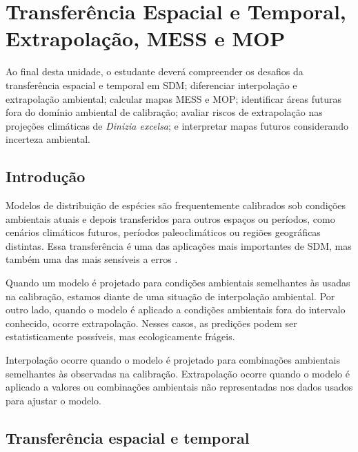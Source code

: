 \chapter[Transferência e extrapolação]{Transferência Espacial e Temporal, Extrapolação, MESS e MOP}

\begin{objetivos}
	Ao final desta unidade, o estudante deverá compreender os desafios da transferência espacial e temporal em SDM; diferenciar interpolação e extrapolação ambiental; calcular mapas MESS e MOP; identificar áreas futuras fora do domínio ambiental de calibração; avaliar riscos de extrapolação nas projeções climáticas de \textit{Dinizia excelsa}; e interpretar mapas futuros considerando incerteza ambiental.
\end{objetivos}

\section{Introdução}

Modelos de distribuição de espécies são frequentemente calibrados sob condições ambientais atuais e depois transferidos para outros espaços ou períodos, como cenários climáticos futuros, períodos paleoclimáticos ou regiões geográficas distintas. Essa transferência é uma das aplicações mais importantes de SDM, mas também uma das mais sensíveis a erros \parencite{peterson2011,araujo2012,yates2018transferability,zurell2020benchmarking}.

Quando um modelo é projetado para condições ambientais semelhantes às usadas na calibração, estamos diante de uma situação de interpolação ambiental. Por outro lado, quando o modelo é aplicado a condições ambientais fora do intervalo conhecido, ocorre extrapolação. Nesses casos, as predições podem ser estatisticamente possíveis, mas ecologicamente frágeis.

\begin{conceito}[title={\faBook\quad Interpolação versus extrapolação}]
	Interpolação ocorre quando o modelo é projetado para combinações ambientais semelhantes às observadas na calibração. Extrapolação ocorre quando o modelo é aplicado a valores ou combinações ambientais não representadas nos dados usados para ajustar o modelo.
\end{conceito}

\section{Transferência espacial e temporal}

